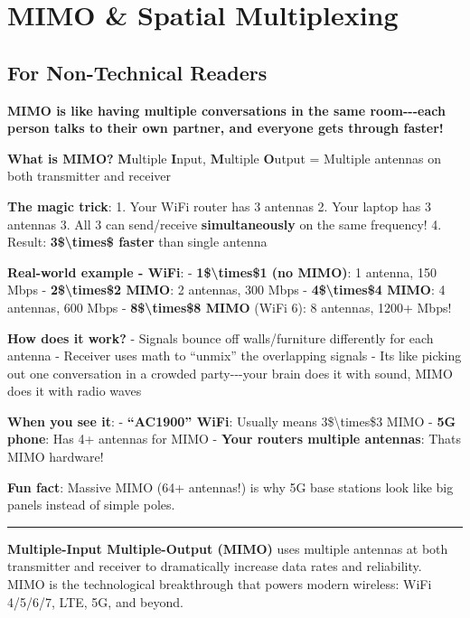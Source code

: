 \section{MIMO \& Spatial Multiplexing}\label{mimo-spatial-multiplexing}

\subsection{\texorpdfstring{ For Non-Technical
Readers}{ For Non-Technical Readers}}\label{for-non-technical-readers}

\textbf{MIMO is like having multiple conversations in the same
room-\/-\/-each person talks to their own partner, and everyone gets
through faster!}

\textbf{What is MIMO?} \textbf{M}ultiple \textbf{I}nput,
\textbf{M}ultiple \textbf{O}utput = Multiple antennas on both
transmitter and receiver

\textbf{The magic trick}: 1. Your WiFi router has 3 antennas 2. Your
laptop has 3 antennas 3. All 3 can send/receive \textbf{simultaneously}
on the same frequency! 4. Result: \textbf{3\$\textbackslash times\$
faster} than single antenna

\textbf{Real-world example - WiFi}: - \textbf{1\$\textbackslash times\$1
(no MIMO)}: 1 antenna, 150 Mbps - \textbf{2\$\textbackslash times\$2
MIMO}: 2 antennas, 300 Mbps - \textbf{4\$\textbackslash times\$4 MIMO}:
4 antennas, 600 Mbps - \textbf{8\$\textbackslash times\$8 MIMO} (WiFi
6): 8 antennas, 1200+ Mbps!

\textbf{How does it work?} - Signals bounce off walls/furniture
differently for each antenna - Receiver uses math to ``unmix'' the
overlapping signals - It\textquotesingle s like picking out one
conversation in a crowded party-\/-\/-your brain does it with sound,
MIMO does it with radio waves

\textbf{When you see it}: - \textbf{``AC1900'' WiFi}: Usually means
3\$\textbackslash times\$3 MIMO - \textbf{5G phone}: Has 4+ antennas for
MIMO - \textbf{Your router\textquotesingle s multiple antennas}:
That\textquotesingle s MIMO hardware!

\textbf{Fun fact}: Massive MIMO (64+ antennas!) is why 5G base stations
look like big panels instead of simple poles.

\begin{center}\rule{0.5\linewidth}{0.5pt}\end{center}

\textbf{Multiple-Input Multiple-Output (MIMO)} uses multiple antennas at
both transmitter and receiver to dramatically increase data rates and
reliability. MIMO is the technological breakthrough that powers modern
wireless: WiFi 4/5/6/7, LTE, 5G, and beyond.

